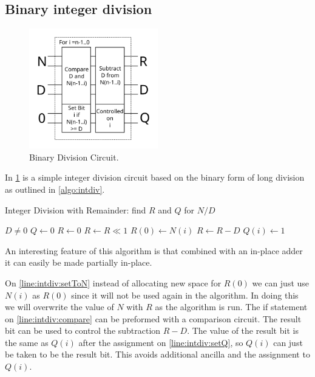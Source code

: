   \subsection{Binary integer division}
    \begin{figure}
      \capstart
      \centering
      \includegraphics[width=0.5\textwidth]{images/division}
      \caption{Binary Division Circuit.}
      \label{fig:div}
     \end{figure}
  In \cref{fig:div} is a simple integer division circuit based on the binary
  form of long division as outlined in \cref{algo:intdiv}.
    \begin{algorithm}
      \capstart
      \caption{Integer Division with Remainder: find $R$ and $Q$ for $N/D$}
      \begin{algorithmic}[1]
        \Require $D \neq 0$
        \State $Q \gets 0$
        \State $R \gets 0$
          \State $R \gets R \ll 1$
          \State $R(0) \gets N(i)$ \label{line:intdiv:setToN}
           \label{line:intdiv:compare}
            \State $R\gets R - D$
            \State $Q(i) \gets 1$ \label{line:intdiv:setQ}
          \EndIf
        \EndFor
      \end{algorithmic}
      \label{algo:intdiv}
    \end{algorithm}
    An interesting feature of this algorithm is that combined with an in-place adder\cite{CDKM:2004} it can easily be made partially in-place.

    On \cref{line:intdiv:setToN} instead of allocating new space for $R(0)$ we can just use $N(i)$ as $R(0)$ since it will not be used again in the algorithm.
    In doing this we will overwrite the value of $N$ with $R$ as the algorithm is run.
    The if statement on \cref{line:intdiv:compare} can be preformed with a comparison circuit.
    The result bit can be used to control the subtraction $R-D$.
    The value of the result bit is the same as $Q(i)$ after the assignment on \cref{line:intdiv:setQ}, so $Q(i)$ can just be taken to be the result bit.
    This avoids additional ancilla and the assignment to $Q(i)$.

